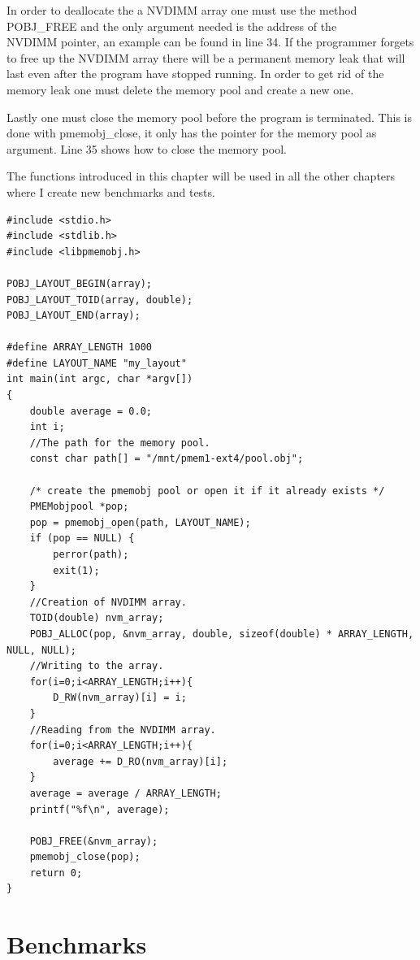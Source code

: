 \documentclass[12pt,a4paper,USenglish]{article}      %
\begin{document}
In order to deallocate the a NVDIMM array one must use the method POBJ\_FREE and the only argument needed is the address of the \\NVDIMM pointer, an example can be found in line 34. If the programmer forgets to free up the NVDIMM array there will be a permanent memory leak that will last even after the program have stopped running. In order to get rid of the memory leak one must delete the memory pool and create a new one.

Lastly one must close the memory pool before the program is terminated. This is done with pmemobj\_close, it only has the pointer for the memory pool as argument. Line 35 shows how to close the memory pool.

The functions introduced in this chapter will be used in all the other chapters where I create new benchmarks and tests.

\begin{lstlisting}[caption={Example of coding with NVDIMM}, label={nvdimm_example}]
#include <stdio.h>
#include <stdlib.h>
#include <libpmemobj.h>

POBJ_LAYOUT_BEGIN(array);
POBJ_LAYOUT_TOID(array, double);
POBJ_LAYOUT_END(array);

#define ARRAY_LENGTH 1000
#define LAYOUT_NAME "my_layout"
int main(int argc, char *argv[])
{
	double average = 0.0;
	int i;
	//The path for the memory pool.
	const char path[] = "/mnt/pmem1-ext4/pool.obj";
	
	/* create the pmemobj pool or open it if it already exists */
	PMEMobjpool *pop;
	pop = pmemobj_open(path, LAYOUT_NAME);
	if (pop == NULL) {
		perror(path);
		exit(1);
	}
	//Creation of NVDIMM array.
	TOID(double) nvm_array;
	POBJ_ALLOC(pop, &nvm_array, double, sizeof(double) * ARRAY_LENGTH, NULL, NULL);
	//Writing to the array.
	for(i=0;i<ARRAY_LENGTH;i++){
		D_RW(nvm_array)[i] = i;
	}
	//Reading from the NVDIMM array.
	for(i=0;i<ARRAY_LENGTH;i++){
		average += D_RO(nvm_array)[i];
	}
	average = average / ARRAY_LENGTH;
	printf("%f\n", average);
	
	POBJ_FREE(&nvm_array);
	pmemobj_close(pop);
	return 0;
}
\end{lstlisting}


\clearpage
\section{Benchmarks}
\label{Chapter:Benchmarks}
\end{document}
